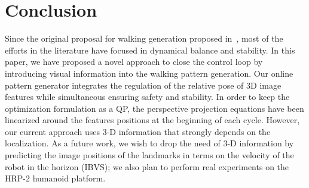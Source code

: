 \section{Conclusion}
\label{sec:conclusions}
Since the original proposal for walking generation proposed in~\cite{Kajita2003}, most of the efforts in the literature have focused in dynamical balance and stability. In this paper, we have proposed a novel approach to close the control loop by introducing visual information into the walking pattern generation. Our online pattern generator integrates the regulation of the relative pose of 3D image features while simultaneous ensuring safety and stability. In order to keep the optimization formulation as a QP, the perspective projection equations have been linearized around the features positions at the beginning of each cycle. However, our current approach uses 3-D information that strongly depends on the localization. As a future work, we wish to drop the need of 3-D information by predicting the image positions of the landmarks in terms on the velocity of the robot in the horizon (IBVS); we also plan to perform real experiments on the HRP-2 humanoid platform.
